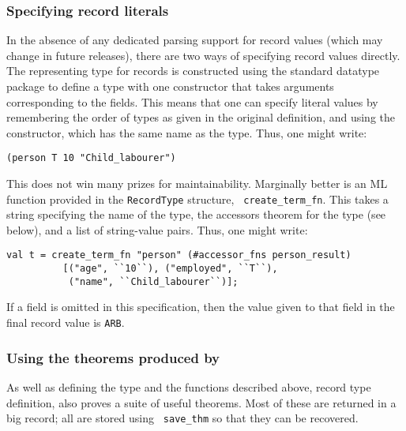 \documentclass[12pt,fleqn,layout,a4paper]{report}
\begin{document}
\subsubsection{Specifying record literals}

In the absence of any dedicated parsing support for record values
(which may change in future releases), there are two ways of
specifying record values directly.  The representing type for records
is constructed using the standard datatype package to define a type
with one constructor that takes arguments corresponding to the fields.
This means that one can specify literal values by remembering the
order of types as given in the original definition, and using the
constructor, which has the same name as the type.  Thus, one might
write:
\begin{verbatim}
(person T 10 "Child_labourer")
\end{verbatim}
This does not win many prizes for maintainability.  Marginally better
is an ML function provided in the {\tt RecordType} structure, {\tt
  create\_term\_fn}.  This takes a string specifying the name of the
type, the accessors theorem for the type (see below), and a list of
string-value pairs.  Thus, one might write:
\begin{verbatim}
val t = create_term_fn "person" (#accessor_fns person_result)
          [("age", ``10``), ("employed", ``T``),
           ("name", ``Child_labourer``)];
\end{verbatim}
If a field is omitted in this specification, then the value given to
that field in the final record value is {\tt ARB}.

\subsubsection{Using the theorems produced by \createrec}

As well as defining the type and the functions described above, record
type definition, also proves a suite of useful theorems.  Most of
these are returned in a big record; all are stored using {\tt
  save\_thm} so that they can be recovered.
\end{document}
